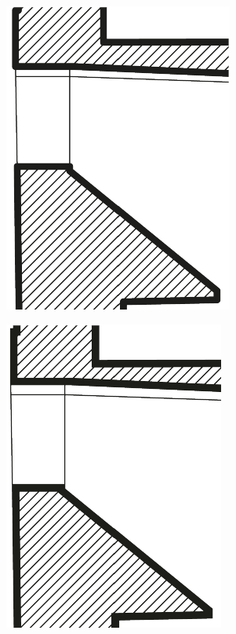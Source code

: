 \begin{figure}[h!tbp]
\centering
\begin{subfigure}{.35\textwidth}
  \centering
  \includegraphics[width=.8\linewidth]{bilder/vektor_grafischeFeinheitenA.pdf}
  \caption{}
\end{subfigure}%
\begin{subfigure}{.35\textwidth}
  \centering
  \includegraphics[width=.8\linewidth]{bilder/vektor_grafischeFeinheitenB.pdf}

\end{subfigure}
\end{figure}
